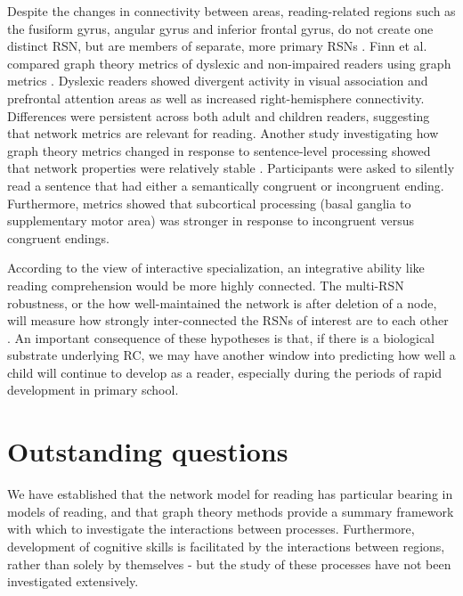 Despite the changes in connectivity between areas, reading-related regions such as the fusiform gyrus, angular gyrus and inferior frontal gyrus, do not create one distinct RSN, but are members of separate, more primary RSNs \citep{Vogel2013}. Finn et al. compared graph theory metrics of dyslexic and non-impaired readers using graph metrics \citep{Finn2014}. Dyslexic readers showed divergent activity in visual association and prefrontal attention areas as well as increased right-hemisphere connectivity. Differences were persistent across both adult and children readers, suggesting that network metrics are relevant for reading. Another study investigating how graph theory metrics changed in response to sentence-level processing showed that network properties were relatively stable \citep{Ye2012}. Participants were asked to silently read a sentence that had either a semantically congruent or incongruent ending. Furthermore, metrics showed that subcortical processing (basal ganglia to supplementary motor area) was stronger in response to incongruent versus congruent endings. 

According to the view of interactive specialization, an integrative ability like reading comprehension would be more highly connected. The multi-RSN robustness, or the how well-maintained the network is after deletion of a node, will measure how strongly inter-connected the RSNs of interest are to each other \citep{Bullmore2009}. An important consequence of these hypotheses is that, if there is a biological substrate underlying RC, we may have another window into predicting how well a child will continue to develop as a reader, especially during the periods of rapid development in primary school.


\section{Outstanding questions}

We have established that the network model for reading has particular bearing in models of reading, and that graph theory methods provide a summary framework with which to investigate the interactions between processes. Furthermore, development of cognitive skills is facilitated by the interactions between regions, rather than solely by themselves - but the study of these processes have not been investigated extensively. 

